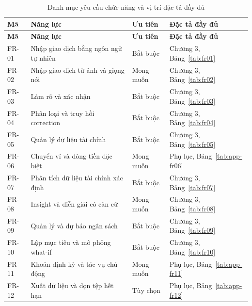 \begin{longtable}{@{}L{1.5cm}L{5.0cm}L{3.0cm}L{4.5cm}@{}}
  \caption{Danh mục yêu cầu chức năng và vị trí đặc tả đầy đủ}
  \label{tab:fr-catalogue}\\
  \toprule
  \textbf{Mã} & \textbf{Năng lực} & \textbf{Ưu tiên} & \textbf{Đặc tả đầy đủ} \\
  \midrule
  \endfirsthead
  \toprule
  \textbf{Mã} & \textbf{Năng lực} & \textbf{Ưu tiên} & \textbf{Đặc tả đầy đủ} \\
  \midrule
  \endhead
  FR-01 & Nhập giao dịch bằng ngôn ngữ tự nhiên & Bắt buộc & Chương 3, Bảng~\ref{tab:fr01} \\
  FR-02 & Nhập giao dịch từ ảnh và giọng nói & Mong muốn & Chương 3, Bảng~\ref{tab:fr02} \\
  FR-03 & Làm rõ và xác nhận & Bắt buộc & Chương 3, Bảng~\ref{tab:fr03} \\
  FR-04 & Phân loại và truy hồi correction & Bắt buộc & Chương 3, Bảng~\ref{tab:fr04} \\
  FR-05 & Quản lý dữ liệu tài chính & Bắt buộc & Chương 3, Bảng~\ref{tab:fr05} \\
  FR-06 & Chuyển ví và dòng tiền đặc biệt & Mong muốn & Phụ lục, Bảng~\ref{tab:app-fr06} \\
  FR-07 & Phân tích dữ liệu tài chính xác định & Bắt buộc & Chương 3, Bảng~\ref{tab:fr07} \\
  FR-08 & Insight và diễn giải có căn cứ & Mong muốn & Chương 3, Bảng~\ref{tab:fr08} \\
  FR-09 & Quản lý và dự báo ngân sách & Bắt buộc & Chương 3, Bảng~\ref{tab:fr09} \\
  FR-10 & Lập mục tiêu và mô phỏng what-if & Bắt buộc & Chương 3, Bảng~\ref{tab:fr10} \\
  FR-11 & Khoản định kỳ và tác vụ chủ động & Mong muốn & Phụ lục, Bảng~\ref{tab:app-fr11} \\
  FR-12 & Xuất dữ liệu và dọn tệp hết hạn & Tùy chọn & Phụ lục, Bảng~\ref{tab:app-fr12} \\
  \bottomrule
\end{longtable}

